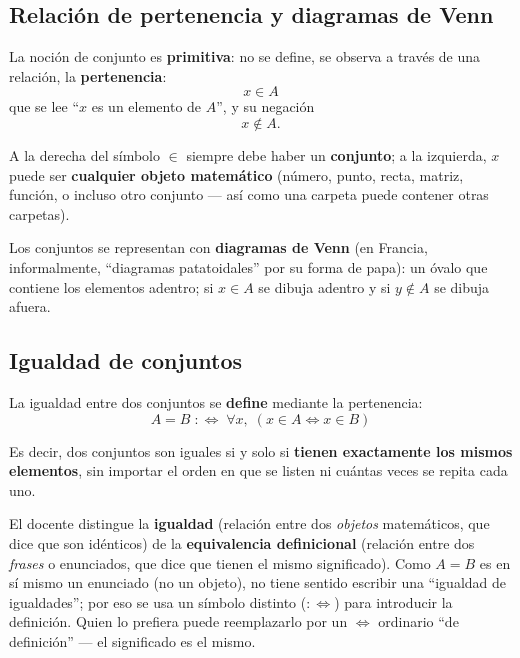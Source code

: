 \documentclass[12pt,a4paper]{article}
\begin{document}
\subsection{Relación de pertenencia y diagramas de Venn}

La noción de conjunto es \textbf{primitiva}: no se define, se observa a
través de una relación, la \textbf{pertenencia}:
\[
x \in A
\]
que se lee ``$x$ es un elemento de $A$'', y su negación
\[
x \notin A.
\]

\begin{notebox}
A la derecha del símbolo $\in$ siempre debe haber un \textbf{conjunto}; a
la izquierda, $x$ puede ser \textbf{cualquier objeto matemático} (número,
punto, recta, matriz, función, o incluso otro conjunto --- así como una
carpeta puede contener otras carpetas).
\end{notebox}

Los conjuntos se representan con \textbf{diagramas de Venn} (en Francia,
informalmente, ``diagramas patatoidales'' por su forma de papa): un óvalo
que contiene los elementos adentro; si $x \in A$ se dibuja adentro y si
$y \notin A$ se dibuja afuera.



\subsection{Igualdad de conjuntos}

La igualdad entre dos conjuntos se \textbf{define} mediante la
pertenencia:
\[
A = B \;:\Longleftrightarrow\; \forall x,\; (x \in A \Longleftrightarrow x \in B)
\]

Es decir, dos conjuntos son iguales si y solo si \textbf{tienen exactamente
los mismos elementos}, sin importar el orden en que se listen ni cuántas
veces se repita cada uno.

\begin{notebox}
El docente distingue la \textbf{igualdad} (relación entre dos \emph{objetos}
matemáticos, que dice que son idénticos) de la \textbf{equivalencia
definicional} (relación entre dos \emph{frases} o enunciados, que dice que
tienen el mismo significado). Como $A = B$ es en sí mismo un enunciado (no
un objeto), no tiene sentido escribir una ``igualdad de igualdades''; por
eso se usa un símbolo distinto ($:\Leftrightarrow$) para introducir la
definición. Quien lo prefiera puede reemplazarlo por un $\Leftrightarrow$
ordinario ``de definición'' --- el significado es el mismo.
\end{notebox}
\end{document}
